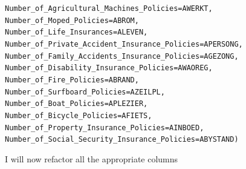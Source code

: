 \documentclass{article}\usepackage[]{graphicx}\usepackage[]{color}
\makeatletter
\newcommand{\hlstd}[1]{\textcolor[rgb]{0.345,0.345,0.345}{#1}}%
\newcommand{\hlkwc}[1]{\textcolor[rgb]{0.333,0.667,0.333}{#1}}%
\newenvironment{kframe}{%
 \def\at@end@of@kframe{}%
 \ifinner\ifhmode%
  \def\at@end@of@kframe{\end{minipage}}%
  \begin{minipage}{\columnwidth}%
 \fi\fi%
 \def\FrameCommand##1{\hskip\@totalleftmargin \hskip-\fboxsep
 \colorbox{shadecolor}{##1}\hskip-\fboxsep
     \hskip-\linewidth \hskip-\@totalleftmargin \hskip\columnwidth}%
 \MakeFramed {\advance\hsize-\width
   \@totalleftmargin\z@ \linewidth\hsize
   \@setminipage}}%
 {\par\unskip\endMakeFramed%
 \at@end@of@kframe}
\newenvironment{knitrout}{}{} %
\makeatother
\begin{document}
\begin{knitrout}
\begin{kframe}
\begin{alltt}
           \hlkwc{Number_of_Agricultural_Machines_Policies}\hlstd{=AWERKT,}
           \hlkwc{Number_of_Moped_Policies}\hlstd{=ABROM,}
           \hlkwc{Number_of_Life_Insurances}\hlstd{=ALEVEN,}
           \hlkwc{Number_of_Private_Accident_Insurance_Policies}\hlstd{=APERSONG,}
           \hlkwc{Number_of_Family_Accidents_Insurance_Policies}\hlstd{=AGEZONG,}
           \hlkwc{Number_of_Disability_Insurance_Policies}\hlstd{=AWAOREG,}
           \hlkwc{Number_of_Fire_Policies}\hlstd{=ABRAND,}
           \hlkwc{Number_of_Surfboard_Policies}\hlstd{=AZEILPL,}
           \hlkwc{Number_of_Boat_Policies}\hlstd{=APLEZIER,}
           \hlkwc{Number_of_Bicycle_Policies}\hlstd{=AFIETS,}
           \hlkwc{Number_of_Property_Insurance_Policies}\hlstd{=AINBOED,}
           \hlkwc{Number_of_Social_Security_Insurance_Policies}\hlstd{=ABYSTAND)}
\end{alltt}
\end{kframe}
\end{knitrout}
I will now refactor all the appropriate columns
\end{document}
